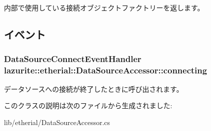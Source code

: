 内部で使用している接続オブジェクトファクトリーを返します。 

\subsection{イベント}
\hypertarget{classlazurite_1_1etherial_1_1_data_source_accessor_a1cb69bb584776cd4924e15ef131ed5d9}{
\subsubsection[{connecting}]{\setlength{\rightskip}{0pt plus 5cm}DataSourceConnectEventHandler lazurite::etherial::DataSourceAccessor::connecting}}
\label{classlazurite_1_1etherial_1_1_data_source_accessor_a1cb69bb584776cd4924e15ef131ed5d9}


データソースへの接続が終了したときに呼び出されます。 

このクラスの説明は次のファイルから生成されました:\begin{DoxyCompactItemize}
\item 
lib/etherial/DataSourceAccessor.cs\end{DoxyCompactItemize}
